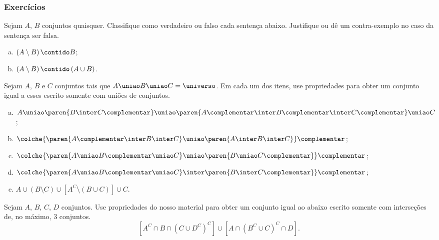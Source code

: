 \begin{frame}
	\frametitle{Exercícios}
	
	\begin{exercicio}
		Sejam $A$, $B$ conjuntos quaisquer. Classifique como verdadeiro ou falso cada sentença abaixo. Justifique ou dê um contra-exemplo no caso da sentença ser falsa.
            \begin{enumerate}[a)]
                \item  $\left(A \setminus B\right) \contido B$;
                \item  $\left(A \setminus B\right) \contido \left(A \cup B\right)$.
            \end{enumerate}
	\end{exercicio}

	\begin{exercicio}
		Sejam $A$, $B$ e $C$ conjuntos tais que $A \uniao B \uniao C = \universo$. Em cada um dos itens, use propriedades para obter um conjunto igual a esses escrito somente com uniões de conjuntos.
		\begin{enumerate}[a)]
			\item $A \uniao \paren{ B \inter C\complementar} \uniao \paren{A\complementar \inter B\complementar \inter C\complementar} \uniao C$;
			\item $\colche{\paren{A\complementar \inter B \inter C} \uniao \paren{A \inter B \inter C}}\complementar$;
			\item $\colche {\paren{A \uniao B\complementar \uniao C} \uniao \paren{B \uniao C\complementar}}\complementar $;
			\item $\colche {\paren{A \uniao B\complementar \uniao C} \inter \paren{B \inter C\complementar}}\complementar $;
			\item $A \cup \left( B \setminus C \right) \cup \left[ A^C \setminus \left( B \cup C \right) \right] \cup C $.
		\end{enumerate}
	\end{exercicio}

	\begin{exercicio}
		Sejam $A$, $B$, $C$, $D$ conjuntos. Use propriedades do nosso material para obter um conjunto igual ao abaixo escrito somente com interseções de, no máximo, 3 conjuntos.
        $$[A^C \cap B \cap (C \cup D^C)^C] \cup [A \cap (B^C \cup C)^C \cap D].$$
	\end{exercicio}
\end{frame}


